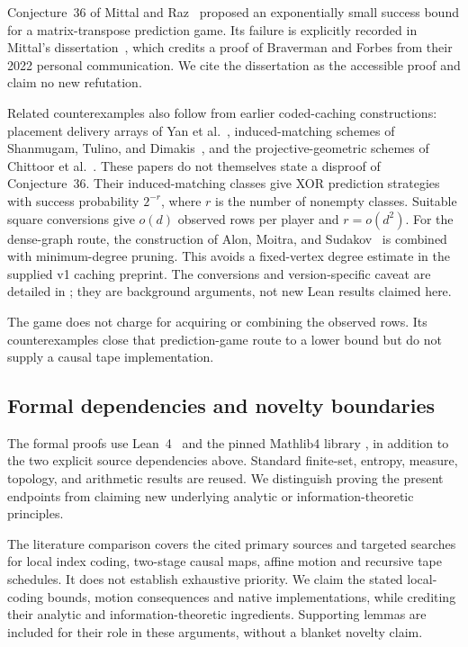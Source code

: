 Conjecture~36 of Mittal and Raz~\cite{MittalRaz2021} proposed an exponentially
small success bound for a matrix-transpose prediction game. Its failure is
explicitly recorded in Mittal's dissertation~\cite[\S10.8.2, Proposition~10.8.3
and Lemma~10.8.5]{Mittal2025}, which credits a proof of Braverman and Forbes
from their 2022 personal communication. We cite the dissertation as the
accessible proof and claim no new refutation.

Related counterexamples also follow from earlier coded-caching constructions:
placement delivery arrays of Yan et al.~\cite{YanEtAl2017}, induced-matching
schemes of Shanmugam, Tulino, and Dimakis~\cite{ShanmugamEtAl2017}, and the
projective-geometric schemes of Chittoor et al.~\cite{ChittoorEtAl2021}.
These papers do not themselves state a disproof of Conjecture~36.
Their induced-matching classes give XOR prediction strategies with success
probability $2^{-r}$, where $r$ is the number of nonempty classes. Suitable
square conversions give $o(d)$ observed rows per player and $r=o(d^2)$.
For the dense-graph route, the construction of Alon, Moitra, and
Sudakov~\cite{AMS2013} is combined with minimum-degree pruning. This avoids a
fixed-vertex degree estimate in the supplied v1 caching preprint. The
conversions and version-specific caveat are detailed in
; they are background arguments, not new Lean
results claimed here.

The game does not charge for acquiring or combining the observed rows.
Its counterexamples close that prediction-game route to a lower bound but
do not supply a causal tape implementation.

\subsection{Formal dependencies and novelty boundaries}

The formal proofs use Lean~4~\cite{Lean4} and the pinned Mathlib4 library
\cite{Mathlib2020,Mathlib4}, in addition to the two explicit source dependencies
above. Standard finite-set, entropy, measure, topology, and arithmetic
results are reused. We distinguish proving the present endpoints from
claiming new underlying analytic or information-theoretic principles.

The literature comparison covers the cited primary sources and targeted
searches for local index coding, two-stage causal maps, affine motion and
recursive tape schedules. It does not establish exhaustive priority. We
claim the stated local-coding bounds, motion consequences and native
implementations, while crediting their analytic and information-theoretic
ingredients. Supporting lemmas are included for their role in these arguments,
without a blanket novelty claim.
